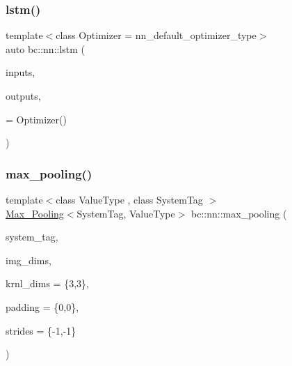 \mbox{\label{namespacebc_1_1nn_a0a21d00395e6af5b4c8b3c298b677195}} 
\subsubsection{\texorpdfstring{lstm()}{lstm()}\hspace{0.1cm}{\footnotesize\ttfamily [2/2]}}
{\footnotesize\ttfamily template$<$class Optimizer  = nn\+\_\+default\+\_\+optimizer\+\_\+type$>$ \\
auto bc\+::nn\+::lstm (\begin{DoxyParamCaption}\item[{int}]{inputs,  }\item[{int}]{outputs,  }\item[{Optimizer}]{ = {\ttfamily Optimizer()} }\end{DoxyParamCaption})}

\mbox{\label{namespacebc_1_1nn_a767fb1c413a31da42831d6bdc91b10af}} 
\subsubsection{\texorpdfstring{max\+\_\+pooling()}{max\_pooling()}\hspace{0.1cm}{\footnotesize\ttfamily [1/3]}}
{\footnotesize\ttfamily template$<$class Value\+Type , class System\+Tag $>$ \\
\hyperlink{structbc_1_1nn_1_1Max__Pooling}{Max\+\_\+\+Pooling}$<$System\+Tag, Value\+Type$>$ bc\+::nn\+::max\+\_\+pooling (\begin{DoxyParamCaption}\item[{System\+Tag}]{system\+\_\+tag,  }\item[{\hyperlink{structbc_1_1Dim}{Dim}$<$ 3 $>$}]{img\+\_\+dims,  }\item[{\hyperlink{structbc_1_1Dim}{Dim}$<$ 2 $>$}]{krnl\+\_\+dims = {\ttfamily \{3,3\}},  }\item[{\hyperlink{structbc_1_1Dim}{Dim}$<$ 2 $>$}]{padding = {\ttfamily \{0,0\}},  }\item[{\hyperlink{structbc_1_1Dim}{Dim}$<$ 2 $>$}]{strides = {\ttfamily \{-\/1,-\/1\}} }\end{DoxyParamCaption})}

